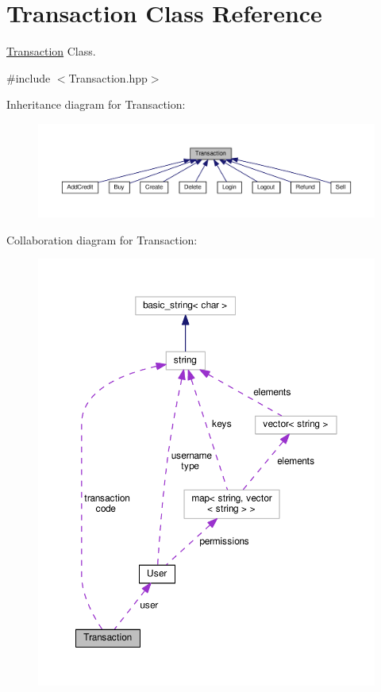 \hypertarget{class_transaction}{\section{Transaction Class Reference}
\label{class_transaction}
}


\hyperlink{class_transaction}{Transaction} Class.  




{\ttfamily \#include $<$Transaction.\-hpp$>$}



Inheritance diagram for Transaction\-:
\nopagebreak
\begin{figure}[H]
\begin{center}
\leavevmode
\includegraphics[width=350pt]{class_transaction__inherit__graph}
\end{center}
\end{figure}


Collaboration diagram for Transaction\-:
\nopagebreak
\begin{figure}[H]
\begin{center}
\leavevmode
\includegraphics[width=350pt]{class_transaction__coll__graph}
\end{center}
\end{figure}
